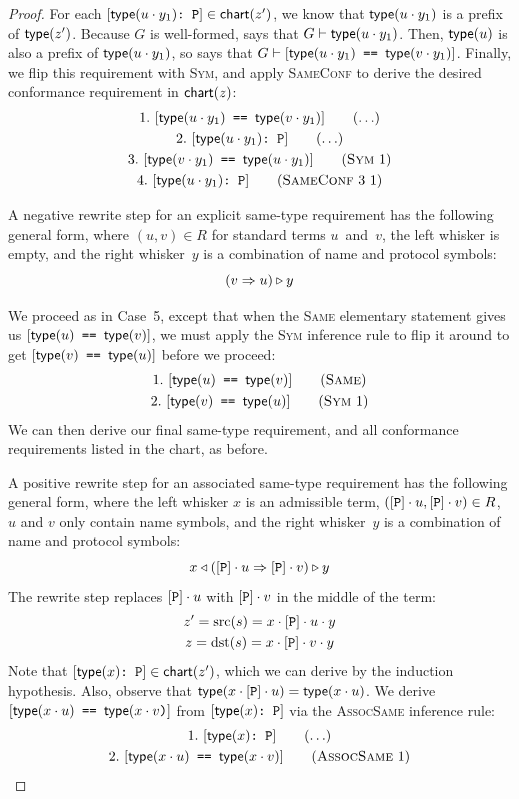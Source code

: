 \documentclass[../generics]{subfiles}
\begin{document}
\begin{proof}
For each $[\texttt{$\mathsf{type}(u\cdot y_1)$:~P}]\in\mathsf{chart}(z')$, we know that $\mathsf{type}(u\cdot y_1)$ is a prefix of $\mathsf{type}(z')$. Because $G$ is well-formed,  says that $G\vdash\mathsf{type}(u\cdot y_1)$. Then, $\mathsf{type}(u)$ is also a prefix of $\mathsf{type}(u\cdot y_1)$, so  says that $G\vdash[\texttt{$\mathsf{type}(u\cdot y_1)$ == $\mathsf{type}(v\cdot y_1)$}]$. Finally, we flip this requirement with \textsc{Sym}, and apply \textsc{SameConf} to derive the desired conformance requirement in $\mathsf{chart}(z)$:
\begin{gather*}
\AnyStep{\SameReq{$\Type(u\cdot y_1)$}{$\Type(v\cdot y_1)$}}{1}\\
\AnyStep{\ConfReq{$\Type(u\cdot y_1)$}{P}}{2}\\
\SymStep{1}{$\Type(v\cdot y_1)$}{$\Type(u\cdot y_1)$}{3}\\
\SameConfStep{3}{1}{$\Type(u\cdot y_1)$}{P}{4}
\end{gather*}

 A negative rewrite step for an explicit same-type requirement has the following general form, where $(u,v)\in R$ for standard terms $u$~and~$v$, the left whisker is empty, and the right whisker~$y$ is a combination of name and protocol symbols:
\[(v\Rightarrow u)\triangleright y\]

We proceed as in Case~5, except that when the \textsc{Same} elementary statement gives us $[\texttt{$\mathsf{type}(u)$ == $\mathsf{type}(v)$}]$, we must apply the \textsc{Sym} inference rule to flip it around to get $[\texttt{$\mathsf{type}(v)$ == $\mathsf{type}(u)$}]$ before we proceed:
\begin{gather*}
\SameStep{$\Type(u)$}{$\Type(v)$}{1}\\
\SymStep{1}{$\Type(v)$}{$\Type(u)$}{2}
\end{gather*}
We can then derive our final same-type requirement, and all conformance requirements listed in the chart, as before.

 A positive rewrite step for an associated same-type requirement has the following general form, where the left whisker $x$ is an admissible term, $([\texttt{P}]\cdot u,[\texttt{P}] \cdot v)\in R$, $u$ and $v$ only contain name symbols, and the right whisker~$y$ is a combination of name and protocol symbols:
\[x\triangleleft([\texttt{P}]\cdot u\Rightarrow[\texttt{P}]\cdot v)\triangleright y\]
The rewrite step replaces $[\texttt{P}]\cdot u$ with $[\texttt{P}]\cdot v$ in the middle of the term:
\begin{gather*}
z'=\operatorname{src}(s)=x\cdot[\texttt{P}]\cdot u\cdot y\\
z=\operatorname{dst}(s)=x\cdot[\texttt{P}]\cdot v\cdot y
\end{gather*}
Note that $[\texttt{$\mathsf{type}(x)$:~P}]\in\mathsf{chart}(z')$, which we can derive by the induction hypothesis. Also, observe that $\mathsf{type}(x\cdot[\texttt{P}]\cdot u)=\mathsf{type}(x\cdot u)$. We derive $[\texttt{$\mathsf{type}(x\cdot u)$ == $\mathsf{type}(x\cdot v$)}]$ from $[\texttt{$\mathsf{type}(x)$:~P}]$ via the \textsc{AssocSame} inference rule:
\begin{gather*}
\AnyStep{\ConfReq{$\Type(x)$}{P}}{1}\\
\AssocSameStep{1}{$\Type(x\cdot u)$}{$\Type(x\cdot v)$}{2}
\end{gather*}


\end{proof}
\end{document}
